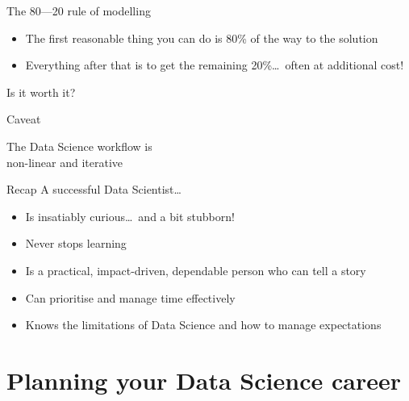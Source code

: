 \begin{frame}{The 80---20 rule of modelling}
    \begin{itemize}
        \item The first \alert{reasonable} thing you can do is 80\% of the way
              to the solution
        \item Everything after that is to get the remaining 20\%\ldots~often at
              additional cost!
    \end{itemize}
    \vfill\pause
    \begin{center}
        \Huge%
        Is it worth it?
    \end{center}
\end{frame}

\begin{frame}{Caveat}
    \begin{center}
        {\Large%
         The Data Science workflow is} \\[\bigskipamount]
        {\Huge%
         \alert{non\hyp{}linear} and \alert{iterative}} \\[2\bigskipamount]
    \end{center}
\end{frame}

\begin{frame}{Recap}
    A successful Data Scientist\ldots
    \begin{itemize}
        \item Is insatiably curious\ldots~and a bit stubborn!
        \item Never stops learning
        \item Is a practical, impact\hyp{}driven, dependable person who can tell
              a story
        \item Can prioritise and manage time effectively
        \item Knows the limitations of Data Science and how to manage
              expectations
    \end{itemize}
\end{frame}

\section{Planning your Data Science career}

